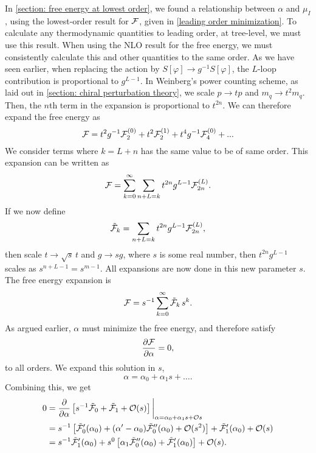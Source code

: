 In \autoref{section: free energy at lowest order}, we found a relationship between $\alpha$ and $\mu_I$, using the lowest-order result for $\mathcal{F}$, given in \autoref{leading order minimization}.
To calculate any thermodynamic quantities to leading order, at tree-level, we must use this result.
When using the NLO result for the free energy, we must consistently calculate this and other quantities to the same order.
As we have seen earlier, when replacing the action by $S[\varphi] \rightarrow g^{-1}S[\varphi]$, the $L$-loop contribution is proportional to $g^{L-1}$.
In Weinberg's power counting scheme, as laid out in \autoref{section: chiral perturbation theory}, we scale $p \rightarrow t p$ and $m_q \rightarrow t^2 m_q$.
Then, the $n$th term in the expansion is proportional to $t^{2n}$.
We can therefore expand the free energy as
\begin{equation}
    \mathcal{F} = t^2 g^{-1} \mathcal{F}_2^{(0)} + t^2 \mathcal{F}_2^{(1)} + t^4 g^{-1} \mathcal{F}_4^{(0)}
    + ...
\end{equation}
%
We consider terms where $k = L + n$ has the same value to be of same order.
This expansion can be written as
\begin{equation}
    \mathcal{F} = \sum_{k=0}^\infty \sum_{n+L=k} t^{2n} g^{L-1} \mathcal{F}_{2n}^{(L)}.
\end{equation}
%
If we now define
\begin{equation}
    \tilde {\mathcal{F}}_k = \sum_{n+L=k} t^{2n} g^{L-1} \mathcal{F}_{2n}^{(L)},
\end{equation}
%
then scale $t \rightarrow \sqrt{s} \, t$ and $g \rightarrow s g$, where $s$ is some real number, then $t^{2n}g^{L-1}$ scales as $s^{n+L-1} = s^{m-1}$.
All expansions are now done in this new parameter $s$.
The free energy expansion is
\begin{equation}
    \mathcal{F} = s^{-1}\sum_{k = 0}^\infty \tilde {\mathcal{F}}_k \, s^{k}.
\end{equation}
%
As argued earlier, $\alpha$ must minimize the free energy, and therefore satisfy
%
\begin{equation}
    \pdv{\mathcal{F}}{\alpha} = 0,
\end{equation}
%
to all orders.
We expand this solution in $s$,
\begin{equation}
    \alpha = \alpha_0 + \alpha_1 s + \dots.
\end{equation}
%
Combining this, we get
%
\begin{align}
    \nonumber
    0 &
    = 
    \pdv{}{\alpha}
    \left[
        s^{-1}\tilde {\mathcal{F}}_0
        + 
        \tilde {\mathcal{F}}_1
        +
        \mathcal O(s)
    \right]
    \bigg|_{\alpha=\alpha_0 + \alpha_1 s + \mathcal O{s}} 
    \\ \nonumber
    & = 
    s^{-1 }
    \left[
        \tilde {\mathcal{F}}_0'(\alpha_0)
        +
        (\alpha' - \alpha_0)
        \tilde {\mathcal{F}}_0''(\alpha_0)
        +
        \mathcal O(s^2)
    \right]
    +
    \tilde{\mathcal{F}}_1'(\alpha_0)
    +
    \mathcal O(s) \\
    &
    =
    s^{-1} \tilde{\mathcal{F}}_1'(\alpha_0)
    + s^{0}
    \left[
        \alpha_1
        \tilde {\mathcal{F}}_0''(\alpha_0)
        +
    \tilde{\mathcal{F}}_1'(\alpha_0)
    \right]
    +
    \mathcal O(s).
    \label{minimizing free energy expansion}
\end{align}
